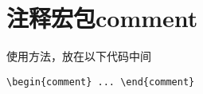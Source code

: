 \section{注释宏包comment} 
使用方法，放在以下代码中间

\begin{lstlisting}[language={[LaTeX]TeX}]
\begin{comment} ... \end{comment}
\end{lstlisting} 

\begin{comment}
ddf
dfdg
\end{comment} 
